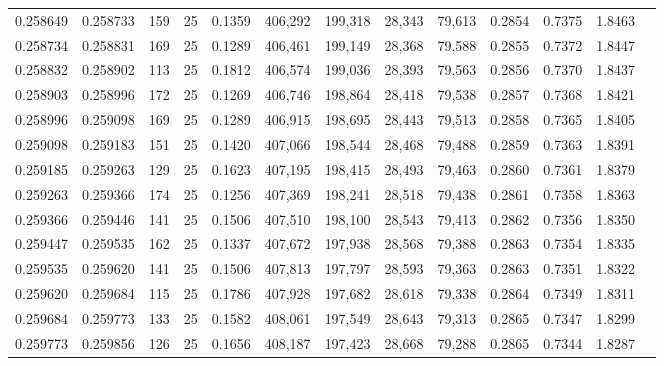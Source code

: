 \begin{tabular}{rrrrrrrrrrrrr}
0.258649 & 0.258733 &   159 &  25 &                                     0.1359 & 406,292 & 199,318 &  28,343 &  79,613 & 0.2854 & 0.7375 & 1.8463 \\
0.258734 & 0.258831 &   169 &  25 &                                     0.1289 & 406,461 & 199,149 &  28,368 &  79,588 & 0.2855 & 0.7372 & 1.8447 \\
0.258832 & 0.258902 &   113 &  25 &                                     0.1812 & 406,574 & 199,036 &  28,393 &  79,563 & 0.2856 & 0.7370 & 1.8437 \\
0.258903 & 0.258996 &   172 &  25 &                                     0.1269 & 406,746 & 198,864 &  28,418 &  79,538 & 0.2857 & 0.7368 & 1.8421 \\
0.258996 & 0.259098 &   169 &  25 &                                     0.1289 & 406,915 & 198,695 &  28,443 &  79,513 & 0.2858 & 0.7365 & 1.8405 \\
0.259098 & 0.259183 &   151 &  25 &                                     0.1420 & 407,066 & 198,544 &  28,468 &  79,488 & 0.2859 & 0.7363 & 1.8391 \\
0.259185 & 0.259263 &   129 &  25 &                                     0.1623 & 407,195 & 198,415 &  28,493 &  79,463 & 0.2860 & 0.7361 & 1.8379 \\
0.259263 & 0.259366 &   174 &  25 &                                     0.1256 & 407,369 & 198,241 &  28,518 &  79,438 & 0.2861 & 0.7358 & 1.8363 \\
0.259366 & 0.259446 &   141 &  25 &                                     0.1506 & 407,510 & 198,100 &  28,543 &  79,413 & 0.2862 & 0.7356 & 1.8350 \\
0.259447 & 0.259535 &   162 &  25 &                                     0.1337 & 407,672 & 197,938 &  28,568 &  79,388 & 0.2863 & 0.7354 & 1.8335 \\
0.259535 & 0.259620 &   141 &  25 &                                     0.1506 & 407,813 & 197,797 &  28,593 &  79,363 & 0.2863 & 0.7351 & 1.8322 \\
0.259620 & 0.259684 &   115 &  25 &                                     0.1786 & 407,928 & 197,682 &  28,618 &  79,338 & 0.2864 & 0.7349 & 1.8311 \\
0.259684 & 0.259773 &   133 &  25 &                                     0.1582 & 408,061 & 197,549 &  28,643 &  79,313 & 0.2865 & 0.7347 & 1.8299 \\
0.259773 & 0.259856 &   126 &  25 &                                     0.1656 & 408,187 & 197,423 &  28,668 &  79,288 & 0.2865 & 0.7344 & 1.8287 \\

\end{tabular}
